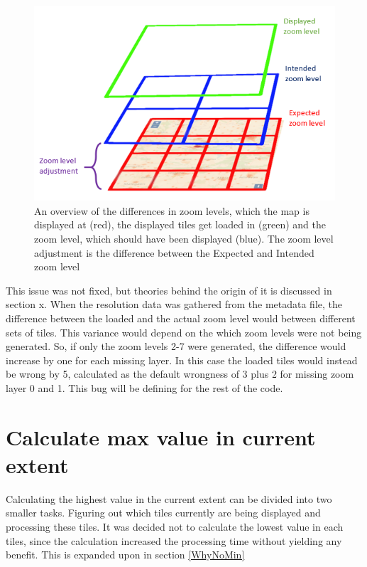 \begin{figure} [H]
	\centering
	\includegraphics[width=.8\textwidth]{Pictures/DifferentZoom}
	\caption{An overview of the differences in zoom levels, which the map is displayed at (red), the displayed tiles get loaded in (green) and the zoom level, which should have been displayed (blue). The zoom level adjustment is the difference between the Expected and Intended zoom level}
	\label{DifferentZoom}
\end{figure}
This issue was not fixed, but theories behind the origin of it is discussed in section x. When the resolution data was gathered from the metadata file, the difference between the loaded and the actual zoom level would between different sets of tiles. This variance would depend on the which zoom levels were not being generated. So, if only the zoom levels 2-7 were generated, the difference would increase by one for each missing layer. In this case the loaded tiles would instead be wrong by 5, calculated as the default wrongness of 3 plus 2 for missing zoom layer 0 and 1. 
This bug will be defining for the rest of the code.



\section{Calculate max value in current extent}
Calculating the highest value in the current extent can be divided into two smaller tasks. Figuring out which tiles currently are being displayed and processing these tiles. It was decided not to calculate the lowest value in each tiles, since the calculation increased the processing time without yielding any benefit. This is expanded upon in section \ref{WhyNoMin}

